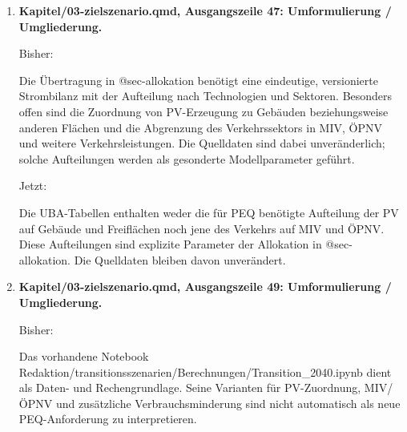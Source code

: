 \documentclass[
  ngerman,
  a4paper,
  DIV=11]{scrreprt}
\newenvironment{Shaded}{\begin{snugshade}}{\end{snugshade}}
\newcommand{\NormalTok}[1]{\textcolor[rgb]{0.00,0.23,0.31}{#1}}
\begin{document}
\begin{enumerate}
  Bisher:

\begin{Shaded}
\begin{Highlighting}[]
\NormalTok{\#\# Schnittstelle zur sektoralen Allokation}
\end{Highlighting}
\end{Shaded}

  Jetzt:

\begin{Shaded}
\begin{Highlighting}[]
\NormalTok{\#\# Übergang zur Allokation}
\end{Highlighting}
\end{Shaded}
\item
  \textbf{Kapitel/03-zielszenario.qmd, Ausgangszeile 47: Umformulierung
  / Umgliederung.}

  Bisher:

\begin{Shaded}
\begin{Highlighting}[]
\NormalTok{Die Übertragung in @sec{-}allokation benötigt eine eindeutige, versionierte Strombilanz mit der Aufteilung nach Technologien und Sektoren. Besonders offen sind die Zuordnung von PV{-}Erzeugung zu Gebäuden beziehungsweise anderen Flächen und die Abgrenzung des Verkehrssektors in MIV, ÖPNV und weitere Verkehrsleistungen. Die Quelldaten sind dabei unveränderlich; solche Aufteilungen werden als gesonderte Modellparameter geführt.}
\end{Highlighting}
\end{Shaded}

  Jetzt:

\begin{Shaded}
\begin{Highlighting}[]
\NormalTok{Die UBA{-}Tabellen enthalten weder die für PEQ benötigte Aufteilung der PV auf Gebäude und Freiflächen noch jene des Verkehrs auf MIV und ÖPNV. Diese Aufteilungen sind explizite Parameter der Allokation in @sec{-}allokation. Die Quelldaten bleiben davon unverändert.}
\end{Highlighting}
\end{Shaded}
\item
  \textbf{Kapitel/03-zielszenario.qmd, Ausgangszeile 49: Umformulierung
  / Umgliederung.}

  Bisher:

\begin{Shaded}
\begin{Highlighting}[]
\NormalTok{Das vorhandene Notebook \textasciigrave{}Redaktion/transitionsszenarien/Berechnungen/Transition\_2040.ipynb\textasciigrave{} dient als Daten{-} und Rechengrundlage. Seine Varianten für PV{-}Zuordnung, MIV/ÖPNV und zusätzliche Verbrauchsminderung sind nicht automatisch als neue PEQ{-}Anforderung zu interpretieren.}


\end{Highlighting}
\end{Shaded}
\end{enumerate}
\end{document}

